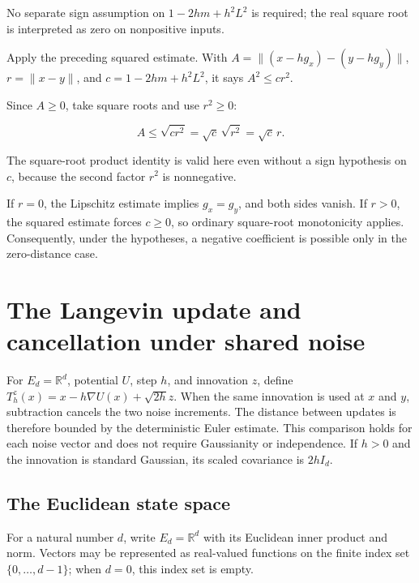 \documentclass[11pt,a4paper]{article}
\begin{document}
No separate sign assumption on \(1-2hm+h^2L^2\) is required; the real square root is interpreted as zero on nonpositive inputs.



Apply the preceding squared estimate. With \(A=\|(x-hg_x)-(y-hg_y)\|\), \(r=\|x-y\|\), and \(c=1-2hm+h^2L^2\), it says \(A^2\le cr^2\).



Since \(A\ge0\), take square roots and use \(r^2\ge0\):

\[A\le\sqrt{cr^2}=\sqrt c\,\sqrt{r^2}=\sqrt c\,r.\]

The square-root product identity is valid here even without a sign hypothesis on \(c\), because the second factor \(r^2\) is nonnegative.



If \(r=0\), the Lipschitz estimate implies \(g_x=g_y\), and both sides vanish. If \(r>0\), the squared estimate forces \(c\ge0\), so ordinary square-root monotonicity applies. Consequently, under the hypotheses, a negative coefficient is possible only in the zero-distance case.


\section{\texorpdfstring{The Langevin update and cancellation under shared noise}{The Langevin update and cancellation under shared noise}}


For \(E_d=\mathbb R^d\), potential \(U\), step \(h\), and innovation \(z\), define \(T_h^z(x)=x-h\nabla U(x)+\sqrt{2h}z\). When the same innovation is used at \(x\) and \(y\), subtraction cancels the two noise increments. The distance between updates is therefore bounded by the deterministic Euler estimate. This comparison holds for each noise vector and does not require Gaussianity or independence. If \(h>0\) and the innovation is standard Gaussian, its scaled covariance is \(2hI_d\).


\subsection{\texorpdfstring{The Euclidean state space}{The Euclidean state space}}


For a natural number \(d\), write \(E_d=\mathbb R^d\) with its Euclidean inner product and norm. Vectors may be represented as real-valued functions on the finite index set \(\{0,\ldots,d-1\}\); when \(d=0\), this index set is empty.
\end{document}

